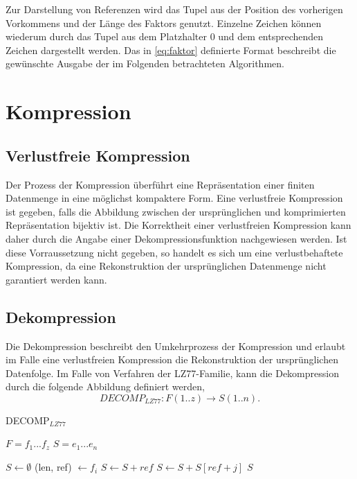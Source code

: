 Zur Darstellung von Referenzen wird das Tupel aus der Position des vorherigen Vorkommens und der Länge des Faktors genutzt. Einzelne Zeichen können wiederum durch das Tupel aus dem Platzhalter 0 und dem
entsprechenden Zeichen dargestellt werden. Das in \ref{eq:faktor} definierte Format beschreibt die gewünschte Ausgabe der im Folgenden betrachteten Algorithmen.

\section{Kompression} \label{comp}

\subsection{Verlustfreie Kompression}
Der Prozess der Kompression überführt eine Repräsentation einer finiten Datenmenge in eine möglichst kompaktere Form. Eine verlustfreie Kompression ist gegeben, falls die Abbildung
zwischen der ursprünglichen und komprimierten Repräsentation bijektiv ist. Die Korrektheit einer verlustfreien Kompression kann daher durch die Angabe einer Dekompressionsfunktion 
nachgewiesen werden. Ist diese Vorraussetzung nicht gegeben, so handelt es sich um eine verlustbehaftete Kompression, da eine Rekonstruktion der ursprünglichen Datenmenge nicht 
garantiert werden kann.

\subsection{Dekompression}
Die Dekompression beschreibt den Umkehrprozess der Kompression und erlaubt im Falle eine verlustfreien Kompression die Rekonstruktion der ursprünglichen Datenfolge. Im Falle von 
Verfahren der LZ77-Familie, kann die Dekompression durch die folgende Abbildung definiert werden, 
\begin{equation}
    DECOMP_{LZ77}: F(1..z) \rightarrow S(1..n).
\end{equation}

\begin{algorithm} [ht]
\centering
\caption{DECOMP$_{LZ77}$} \label{alg:decomp}
\algorithmicrequire $F=f_1...f_z$
\algorithmicensure $S=e_1...e_n$
\begin{algorithmic}
    \STATE $S \gets \emptyset$
        \STATE (len, ref) $\gets f_i$
            \STATE $S \gets S + ref$
        \ELSE
                \STATE $S \gets S + S[ref + j]$
            \ENDFOR
        \ENDIF
    \ENDFOR
    \RETURN $S$
\end{algorithmic}
\end{algorithm}

